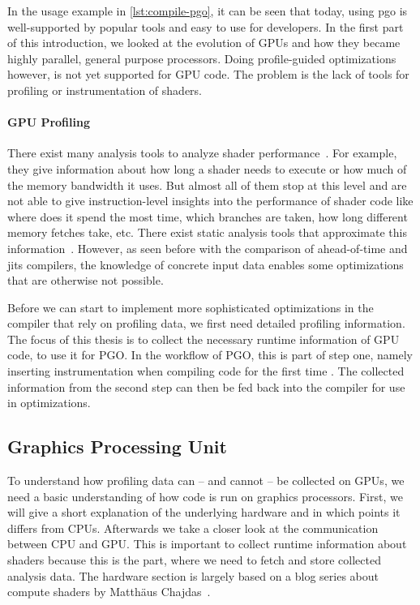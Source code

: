 In the usage example in \cref{lst:compile-pgo}, it can be seen that today, using \gls{pgo} is well-supported by popular tools and easy to use for developers. In the first part of this introduction, we looked at the evolution of GPUs and how they became highly parallel, general purpose processors. Doing profile-guided optimizations however, is not yet supported for GPU code. The problem is the lack of tools for profiling or instrumentation of shaders.

\paragraph{GPU Profiling} There exist many analysis tools to analyze shader performance~\cite{RenderDoc, NvidiaShaderPerf}. For example, they give information about how long a shader needs to execute or how much of the memory bandwidth it uses. But almost all of them stop at this level and are not able to give instruction-level insights into the performance of shader code like where does it spend the most time, which branches are taken, how long different memory fetches take, etc. There exist static analysis tools that approximate this information~\cite{AMDShaderAnalyzer}. However, as seen before with the comparison of ahead-of-time and \glspl{jit} compilers, the knowledge of concrete input data enables some optimizations that are otherwise not possible.

Before we can start to implement more sophisticated optimizations in the compiler that rely on profiling data, we first need detailed profiling information. The focus of this thesis is to collect the necessary runtime information of GPU code, to use it for PGO. In the workflow of PGO, this is part of step one, namely inserting instrumentation when compiling code for the first time%
. The collected information from the second step can then be fed back into the compiler for use in optimizations.

\subsection{Graphics Processing Unit}
To understand how profiling data can -- and cannot -- be collected on GPUs, we need a basic understanding of how code is run on graphics processors. First, we will give a short explanation of the underlying hardware and in which points it differs from CPUs. Afterwards we take a closer look at the communication between CPU and GPU. This is important to collect runtime information about shaders because this is the part, where we need to fetch and store collected analysis data. The hardware section is largely based on a blog series about compute shaders by Matthäus Chajdas~\cite{Chajdas2018}.

